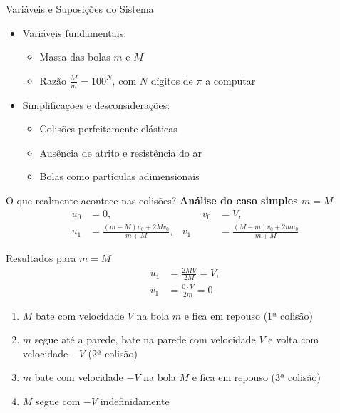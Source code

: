 \documentclass{beamer}
\begin{document}
\begin{frame}{Variáveis e Suposições do Sistema}
  \begin{itemize}
    \item Variáveis fundamentais:
      \begin{itemize}
        \item Massa das bolas $m$ e $M$
        \item Razão $\tfrac{M}{m} = 100^N$, com $N$ dígitos de $\pi$ a computar
      \end{itemize}
    \item Simplificações e desconsiderações:
      \begin{itemize}
        \item Colisões perfeitamente elásticas
        \item Ausência de atrito e resistência do ar
        \item Bolas como partículas adimensionais
      \end{itemize}
  \end{itemize}
\end{frame}

\begin{frame}{O que realmente acontece nas colisões?}
  \textbf{Análise do caso simples $m = M$}
  \begin{equation*}
    \begin{alignedat}{2}
      u_0 &= 0,                           &\qquad v_0 &= V, \\
      u_1 &= \frac{(m - M)u_0 + 2Mv_0}{m + M}, & v_1 &= \frac{(M - m)v_0 + 2mu_0}{m + M}
    \end{alignedat}
  \end{equation*}
\end{frame}

\begin{frame}{Resultados para $m = M$}
  \begin{equation*}
    \begin{aligned}
      u_1 &= \frac{2MV}{2M} = V, \\
      v_1 &= \frac{0 \cdot V}{2m} = 0
    \end{aligned}
  \end{equation*}
  \begin{enumerate}
    \item $M$ bate com velocidade $V$ na bola $m$ e fica em repouso (1ª colisão)
    \item $m$ segue até a parede, bate na parede com velocidade $V$ e volta com velocidade $-V$ (2ª colisão)
    \item $m$ bate com velocidade $-V$ na bola $M$ e fica em repouso (3ª colisão)
    \item $M$ segue com $-V$ indefinidamente
  \end{enumerate}
\end{frame}
\end{document}
